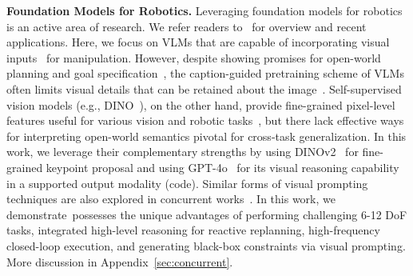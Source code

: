 \textbf{Foundation Models for Robotics. }
Leveraging foundation models for robotics is an active area of research.
We refer readers to~\cite{hu2023toward,firoozi2023foundation,kawaharazuka2024real,yang2023foundation} for overview and recent applications.
Here, we focus on VLMs that are capable of incorporating visual inputs~\cite{radford2021learning,ramesh2021zero, li2022blip,achiam2023gpt,li2023blip,openai2023gpt} for manipulation.
However, despite showing promises for open-world planning and goal specification~\cite{huang2024copa,liu2024moka,nasiriany2024pivot,hu2023look,du2023video,hong20233d,chen2024spatialvlm,huang2023voxposer,brohan2023rt,gao2023physically,wang2024grounding,hsu2023ns3d,gao2024physically,yuan2024robopoint,duan2024manipulate}, the caption-guided pretraining scheme of VLMs often limits visual details that can be retained about the image~\cite{tong2024eyes,thrush2022winoground,yuksekgonul2023and,hsieh2024sugarcrepe}.
Self-supervised vision models (e.g., DINO~\cite{caron2021emerging, oquab2023dinov2}), on the other hand, provide fine-grained pixel-level features useful for various vision and robotic tasks~\cite{amir2021deep,melas2022deep,wang2023d3fields,zhu2023learning,lin2023spawnnet,di2024keypoint,di2024dinobot}, but there lack effective ways for interpreting open-world semantics pivotal for cross-task generalization.
In this work, we leverage their complementary strengths by using DINOv2~\cite{oquab2023dinov2} for fine-grained keypoint proposal and using GPT-4o~\cite{openai2023gpt} for its visual reasoning capability in a supported output modality (code). %
Similar forms of visual prompting techniques are also explored in concurrent works~\cite{huang2024copa,liu2024moka,nasiriany2024pivot,yuan2024robopoint,lee2024affordance}.
In this work, we demonstrate~\algabrvname possesses the unique advantages of performing challenging 6-12 DoF tasks, integrated high-level reasoning for reactive replanning, high-frequency closed-loop execution, and generating black-box constraints via visual prompting. More discussion in Appendix~\ref{sec:concurrent}.










